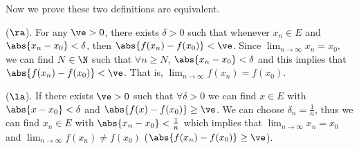 \begin{remark}
Now we prove these two definitions are equivalent.

($\ra$). For any $\ve>0$, there exists $\delta>0$ such that whenever $x_n\in E$ and $\abs{x_n -x_0} <\delta$, then $\abs{f(x_n)-f(x_0)}<\ve$. Since $\lim_{n\to \infty}x_n = x_0$, we can find $N\in \N$ such that $\forall n\geq N$, $\abs{x_n -x_0}<\delta$ and this implies that $\abs{f(x_n)-f(x_0)}<\ve$. That is, $\lim_{n\to \infty}f(x_n) = f(x_0)$.

($\la$). If there exists $\ve>0$ such that $\forall \delta>0$ we can find $x\in E$ with $\abs{x-x_0} <\delta$ and $\abs{f(x)-f(x_0)} \geq \ve$. We can choose $\delta_n = \frac 1n$, thus we can find $x_n\in E$ with $\abs{x_n - x_0} < \frac 1n$ which implies that $\lim_{n\to \infty} x_n = x_0$ and $\lim_{n\to\infty}f(x_n) \neq f(x_0)$ ($\abs{f(x_n)-f(x_0)} \geq \ve$).
\end{remark}








